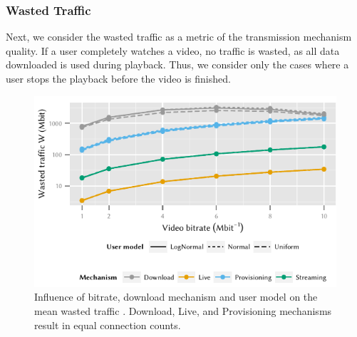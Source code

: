 \subsubsection*{Wasted Traffic}\label{sec:application:lte_video:numerical_evaluation:wasted_traffic}
Next, we consider the wasted traffic \meanwastedtraffic as a metric of the transmission mechanism quality.
If a user completely watches a video, no traffic is wasted, as all data downloaded is used during playback.
Thus, we consider only the cases where a user stops the playback before the video is finished.

\begin{figure}
  \centering
  \includegraphics{application/lte_video/numerical_evaluation/figures/bitrate2lostData}
  \caption{Influence of bitrate, download mechanism and user model on the mean wasted traffic \meanwastedtraffic. Download, Live, and Provisioning mechanisms result in equal connection counts.}
  \label{fig:application:lte_video:numerical_evaluation:energy_consumption:bitrate2lostData}
\end{figure}

